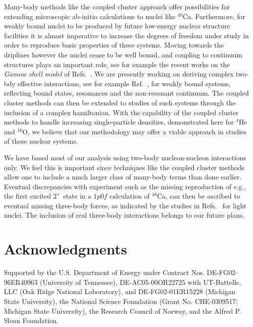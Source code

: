 \documentclass[fleqn,12pt,twoside]{article}
\begin{document}
Many-body methods like the 
coupled cluster approach offer possibilities for extending
microscopic ab-initio calculations to nuclei like $^{40}$Ca.
Furthermore, for weakly bound nuclei to be produced by future low-energy 
nuclear structure facilities
it is almost imperative to increase the
degrees of freedom under study in order to reproduce
basic properties of these systems. 
Moving towards the driplines however the 
nuclei cease to be well bound,  
and coupling to continuum structures plays an important role,
see for example the recent works on 
the \emph{Gamow shell model} of Refs.~\cite{betan,witek2}. 
We are presently working on deriving complex 
two-bdy effective interactions, see for example
Ref.~\cite{hvh2004}, 
for weakly bound systems, reflecting bound states, resonances and the non-resonant 
continuum. The coupled cluster methods can then be extended 
to studies of such  systems through the inclusion  
of a complex hamiltonian. With the capability of the coupled cluster methods to handle
increasing single-particle densities, demonstrated here for $^{4}$He and
$^{16}$O, we believe that our methodology may offer a viable approach in studies
of these nuclear systems.   

We have based most of our analysis 
using two-body nucleon-nucleon interactions only. 
We feel this is important since
techniques like the coupled cluster methods 
allow one to include a much larger
class of many-body terms than done earlier. Eventual discrepancies 
with experiment 
such as the missing reproduction of e.g., the first 
excited $2^+$ state in a $1p0f$ calculation
of $^{48}$Ca, can then be ascribed to eventual 
missing three-body forces, as indicated by the studies
in Refs.~\cite{petr_erich2002,bob1,petr_erich2003} 
for light nuclei. 
The inclusion of real three-body interactions belongs 
to our future plans.

 \section*{Acknowledgments}
Supported by the U.S. Department of Energy
 under
 Contract Nos. DE-FG02-96ER40963 (University of Tennessee),
 DE-AC05-00OR22725 with UT-Battelle, LLC (Oak Ridge
 National Laboratory), and DE-FG02-01ER15228 (Michigan State University),
 the National Science Foundation (Grant No. CHE-0309517; Michigan State University),
 the Research Council of Norway, and the Alfred P. Sloan Foundation.
\end{document}
